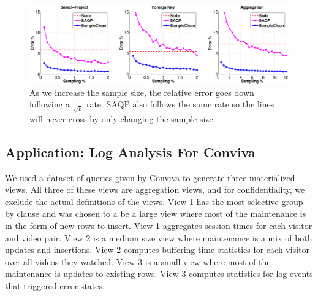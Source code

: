 \begin{figure}[ht!]
\label{exp1sample}
\hspace{-3em}
 \includegraphics[scale=0.20]{exp/exp1-samplesize-accuracy.eps}
 \caption{As we increase the sample size, the relative error goes down following a $\frac{1}{\sqrt{k}}$ rate. SAQP also follows the same rate so the lines will never cross by only changing the sample size.}
\end{figure}

\subsection{Application: Log Analysis For Conviva}
We used a dataset of queries given by Conviva to generate three materialized views.
All three of these views are aggregation views, and for confidentiality, we exclude the actual definitions of the views. 
View 1 has the most selective group by clause and was chosen to a be a large view where most of the maintenance is in the form of new rows to insert.
View 1 aggregates session times for each visitor and video pair.
View 2 is a medium size view where maintenance is a mix of both updates and insertions.
View 2 computes buffering time statistics for each visitor over all videos they watched.
View 3 is a small view where most of the maintenance is updates to existing rows.
View 3 computes statistics for log events that triggered error states.

